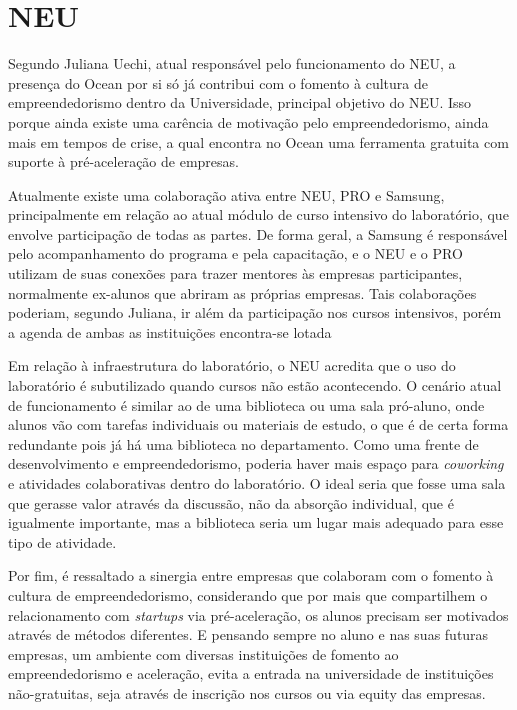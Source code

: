 \section{NEU}

Segundo Juliana Uechi, atual responsável pelo funcionamento do NEU, a presença do Ocean por si só já contribui com o fomento à cultura de empreendedorismo dentro da Universidade, principal objetivo do NEU. Isso porque ainda existe uma carência de motivação pelo empreendedorismo, ainda mais em tempos de crise, a qual encontra no Ocean uma ferramenta gratuita com suporte à pré-aceleração de empresas. 

Atualmente existe uma colaboração ativa entre NEU, PRO e Samsung, principalmente em relação ao atual módulo de curso intensivo do laboratório, que envolve participação de todas as partes. De forma geral, a Samsung é responsável pelo acompanhamento do programa e pela capacitação, e o NEU e o PRO utilizam de suas conexões para trazer mentores às empresas participantes, normalmente ex-alunos que abriram as próprias empresas. Tais colaborações poderiam, segundo Juliana, ir além da participação nos cursos intensivos, porém a agenda de ambas as instituições encontra-se lotada

Em relação à infraestrutura do laboratório, o NEU acredita que o uso do laboratório é subutilizado quando cursos não estão acontecendo. O cenário atual de funcionamento é similar ao de uma biblioteca ou uma sala pró-aluno, onde alunos vão com tarefas individuais ou materiais de estudo, o que é de certa forma redundante pois já há uma biblioteca no departamento. Como uma frente de desenvolvimento e empreendedorismo, poderia haver mais espaço para \textit{coworking} e atividades colaborativas dentro do laboratório. O ideal seria que fosse uma sala que gerasse valor através da discussão, não da absorção individual, que é igualmente importante, mas a biblioteca seria um lugar mais adequado para esse tipo de atividade.

Por fim, é ressaltado a sinergia entre empresas que colaboram com o fomento à cultura de empreendedorismo, considerando que por mais que compartilhem o relacionamento com \textit{startups} via pré-aceleração, os alunos precisam ser motivados através de métodos diferentes. E pensando sempre no aluno e nas suas futuras empresas, um ambiente com diversas instituições de fomento ao empreendedorismo e aceleração, evita a entrada na universidade de instituições não-gratuitas, seja através de inscrição nos cursos ou via equity das empresas.

